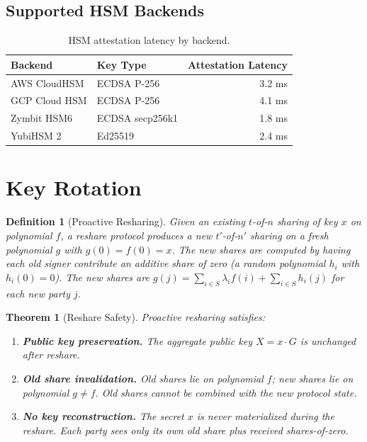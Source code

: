 \documentclass[11pt,a4paper]{article}
\newtheorem{theorem}{Theorem}[section]
\newtheorem{definition}{Definition}[section]
\begin{document}
\subsection{Supported HSM Backends}

\begin{table}[h]
\centering
\begin{tabular}{llr}
\toprule
\textbf{Backend} & \textbf{Key Type} & \textbf{Attestation Latency} \\
\midrule
AWS CloudHSM & ECDSA P-256 & 3.2 ms \\
GCP Cloud HSM & ECDSA P-256 & 4.1 ms \\
Zymbit HSM6 & ECDSA secp256k1 & 1.8 ms \\
YubiHSM 2 & Ed25519 & 2.4 ms \\
\bottomrule
\end{tabular}
\caption{HSM attestation latency by backend.}
\label{tab:hsm}
\end{table}

\section{Key Rotation}
\label{sec:rotation}

\begin{definition}[Proactive Resharing]
Given an existing $t$-of-$n$ sharing of key $x$ on polynomial $f$,
a reshare protocol produces a new $t'$-of-$n'$ sharing on a fresh
polynomial $g$ with $g(0) = f(0) = x$.  The new shares are computed
by having each old signer contribute an additive share of zero
(a random polynomial $h_i$ with $h_i(0) = 0$).  The new shares are
$g(j) = \sum_{i \in S} \lambda_i f(i) + \sum_{i \in S} h_i(j)$ for
each new party $j$.
\end{definition}

\begin{theorem}[Reshare Safety]
\label{thm:reshare}
Proactive resharing satisfies:
\begin{enumerate}[nosep]
  \item \textbf{Public key preservation.}  The aggregate public key
        $X = x \cdot G$ is unchanged after reshare.
  \item \textbf{Old share invalidation.}  Old shares lie on polynomial
        $f$; new shares lie on polynomial $g \neq f$.  Old shares
        cannot be combined with the new protocol state.
  \item \textbf{No key reconstruction.}  The secret $x$ is never
        materialized during the reshare.  Each party sees only its
        own old share plus received shares-of-zero.
\end{enumerate}
\end{theorem}
\end{document}
